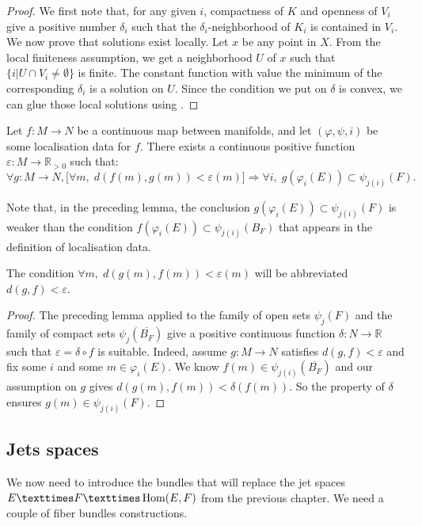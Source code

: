 \begin{proof}
  \leanok
  We first note that, for any given $i$, compactness of $K$ and openness of
  $V_i$ give a positive number $δ_i$ such that the $δ_i$-neighborhood of $K_i$
  is contained in $V_i$. We now prove that solutions exist locally. Let $x$ be
  any point in $X$. From the local finiteness assumption, we get a neighborhood
  $U$ of $x$ such that $\{i | U ∩ V_i ≠ ∅\}$ is finite. The constant function
  with value the minimum of the corresponding $δ_i$ is a solution on $U$. Since
  the condition we put on $δ$ is convex, we can glue those local solutions using
  .
\end{proof}

\begin{lemma}
  \label{lem:localisation_stability}
  \leanok
  Let $f : M → N$ be a continuous map between manifolds, and let
  $(φ, ψ, i)$ be some localisation data for $f$. There exists a continuous
  positive function $ε : M → ℝ_{>0}$ such that:
  \[
    ∀ g : M → N, \big[∀ m,\; d(f(m), g(m)) < ε(m)\big] ⇒ ∀ i,\; g(φ_i(E)) ⊂ ψ_{j(i)}(F).
  \]
\end{lemma}
Note that, in the preceding lemma, the conclusion $g(φ_i(E)) ⊂ ψ_{j(i)}(F)$ is
weaker than the condition $f(φ_i(E)) ⊂ ψ_{j(i)}(B_F)$ that appears in the
definition of localisation data.

The condition $∀ m,\; d(g(m), f(m)) < ε(m)$ will be abbreviated $d(g, f) < ε$.

\begin{proof}
  \leanok
  The preceding lemma applied to the family of open sets $ψ_j(F)$ and the
  family of compact sets $ψ_j(\overline{B_F})$ give a positive continuous
  function $δ : N → ℝ$ such that $ε = δ ∘ f$ is suitable. Indeed, assume
  $g : M → N$ satisfies $d(g, f) < ε$ and fix some $i$ and some $m ∈ φ_i(E)$.
  We know $f(m) ∈ ψ_{j(i)}(\overline{B_F})$ and our assumption on $g$ gives
  $d(g(m), f(m)) < δ(f(m))$. So the property of $δ$ ensures $g(m) ∈ ψ_{j(i)}(F)$.
\end{proof}


\subsection{Jets spaces}

We now need to introduce the bundles that will replace the jet spaces
$E × F × \Hom(E, F)$ from the previous chapter. We need a couple of
fiber bundles constructions.

